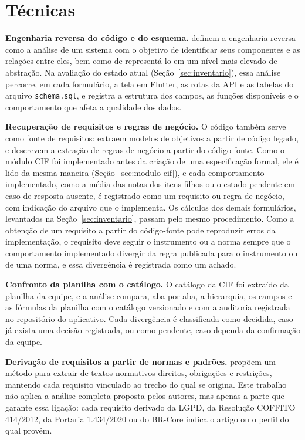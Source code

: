 \section{Técnicas}
\label{sec:tecnicas}

\textbf{Engenharia reversa do código e do esquema.}  definem a engenharia reversa
como a análise de um sistema com o objetivo de identificar seus componentes e as relações entre eles, bem como de
representá-lo em um nível mais elevado de abstração. Na avaliação do estado atual (Seção~\ref{sec:inventario}), essa
análise percorre, em cada formulário, a tela em Flutter, as rotas da API e as tabelas do arquivo \texttt{schema.sql},
e registra a estrutura dos campos, as funções disponíveis e o comportamento que afeta a qualidade dos dados.

\textbf{Recuperação de requisitos e regras de negócio.} O código também serve como fonte de requisitos:
 extraem modelos de objetivos a partir de código legado, e 
descrevem a extração de regras de negócio a partir do código-fonte. Como o módulo CIF foi implementado antes da
criação de uma especificação formal, ele é lido da mesma maneira (Seção~\ref{sec:modulo-cif}), e cada comportamento
implementado, como a média das notas dos itens filhos ou o estado pendente em caso de resposta ausente, é registrado
como um requisito ou regra de negócio, com indicação do arquivo que o implementa. Os cálculos dos demais formulários,
levantados na Seção~\ref{sec:inventario}, passam pelo mesmo procedimento. Como a obtenção de um requisito a partir do
código-fonte pode reproduzir erros da implementação, o requisito deve seguir o instrumento ou a norma sempre que o
comportamento implementado divergir da regra publicada para o instrumento ou de uma norma, e essa divergência é
registrada como um achado.

\textbf{Confronto da planilha com o catálogo.} O catálogo da CIF foi extraído da planilha da equipe, e a análise
compara, aba por aba, a hierarquia, os campos e as fórmulas da planilha com o catálogo versionado e com a auditoria
registrada no repositório do aplicativo. Cada divergência é classificada como decidida, caso já exista uma decisão
registrada, ou como pendente, caso dependa da confirmação da equipe.

\textbf{Derivação de requisitos a partir de normas e padrões.}  propõem um método
para extrair de textos normativos direitos, obrigações e restrições, mantendo cada requisito vinculado ao trecho do
qual se origina. Este trabalho não aplica a análise completa proposta pelos autores, mas apenas a parte que garante
essa ligação: cada requisito derivado da LGPD, da Resolução COFFITO 414/2012, da Portaria 1.434/2020 ou do BR-Core
indica o artigo ou o perfil do qual provém.

